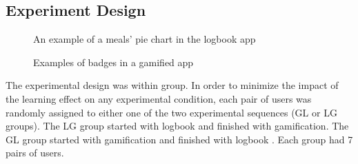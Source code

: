 \documentclass{sig-alternate}
\begin{document}
\subsection{Experiment Design}
\begin{figure}
\centering
{}
\caption{An example of a meals' pie chart in the logbook app}
\label{figure:logbookapp}
\end{figure}
\begin{figure}
\centering
{}
\caption{Examples of badges in a gamified app}
\label{figure:gameapp}
\end{figure}   
The experimental design was within group. In order to minimize the impact of the learning effect on any experimental condition, each pair of users was randomly assigned to either one of the two experimental sequences (GL or LG groups). The LG group started with logbook and finished with gamification. The  GL group started with gamification and finished with logbook . Each group had 7 pairs of users. 
\end{document}
